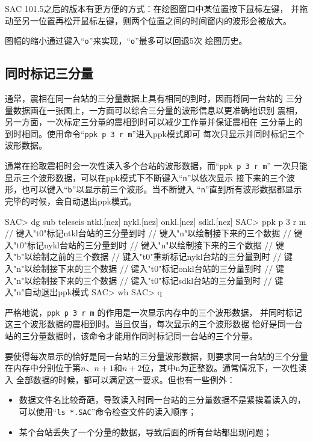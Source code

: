 SAC 101.5之后的版本有更方便的方式：在绘图窗口中某位置按下鼠标左键，
并拖动至另一位置再松开鼠标左键，则两个位置之间的时间窗内的波形会被放大。

图幅的缩小通过键入``\texttt{o}''来实现，``\texttt{o}''最多可以回退5次
绘图历史。

\subsection{同时标记三分量}
通常，震相在同一台站的三分量数据上具有相同的到时，因而将同一台站的
三分量数据画在一张图上，一方面可以综合三分量的波形信息以更准确地识别
震相，另一方面，一次标定三分量的震相到时可以减少工作量并保证震相在
三分量上的到时相同。使用命令``\texttt{ppk p 3 r m}''进入ppk模式即可
每次只显示并同时标记三个波形数据。

通常在拾取震相时会一次性读入多个台站的波形数据，而``\texttt{ppk p 3 r m}''
一次只能显示三个波形数据，可以在ppk模式下不断键入``\texttt{n}''以依次显示
接下来的三个波形，也可以键入``\texttt{b}''以显示前三个波形。当不断键入
``\texttt{n}''直到所有波形数据都显示完毕的时候，会自动退出ppk模式。

\begin{SACCode}
SAC> dg sub teleseis ntkl.[nez] nykl.[nez] onkl.[nez] sdkl.[nez]
SAC> ppk p 3 r m
// 键入"t0"标记ntkl台站的三分量到时
// 键入"n"以绘制接下来的三个数据
// 键入"t0"标记nykl台站的三分量到时
// 键入"n"以绘制接下来的三个数据
// 键入"b"以绘制之前的三个数据
// 键入"t0"重新标记nykl台站的三分量到时
// 键入"n"以绘制接下来的三个数据
// 键入"t0"标记onkl台站的三分量到时
// 键入"n"以绘制接下来的三个数据
// 键入"t0"标记sdkl台站的三分量到时
// 键入"n"自动退出ppk模式
SAC> wh
SAC> q
\end{SACCode}

严格地说，\texttt{ppk p 3 r m} 的作用是一次显示内存中的三个波形数据，
并同时标记这三个波形数据的震相到时。当且仅当，每次显示的三个波形数据
恰好是同一台站的三分量数据时，该命令才能用作同时标记同一台站的三个分量。

要使得每次显示的恰好是同一台站的三分量波形数据，则要求同一台站的三个分量
在内存中分别位于第$n$、$n+1$和$n+2$位，其中n为正整数。通常情况下，一次性读入
全部数据的时候，都可以满足这一要求。但也有一些例外：
\begin{itemize}
\item 数据文件名比较奇葩，导致读入时同一台站的三分量数据不是紧挨着读入的，
    可以使用``\texttt{ls *.SAC}''命令检查文件的读入顺序；
\item 某个台站丢失了一个分量的数据，导致后面的所有台站都出现问题；
\end{itemize}

